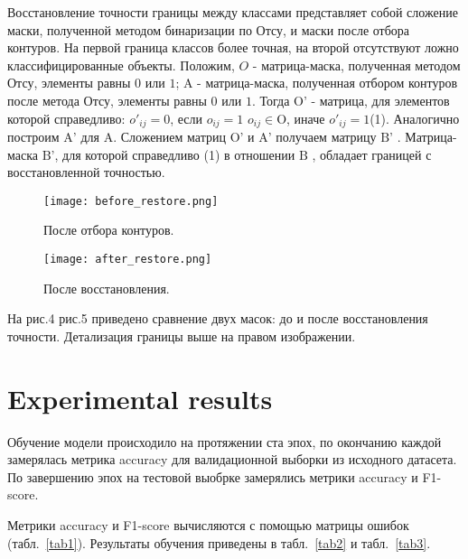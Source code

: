 \documentclass[runningheads]{llncs}
\begin{document}
{Восстановление точности границы между классами представляет  собой сложение маски, полученной методом бинаризации по Отсу, и маски после отбора контуров. На первой граница классов более точная, 
на второй отсутствуют ложно классифицированные объекты.
Положим, $O$ - матрица-маска, полученная методом Отсу, элементы 
равны $0$ или ${\text{1}}$; ${\text{A}}$ - матрица-маска, полученная отбором контуров 
после метода Отсу, элементы равны ${\text{0}}$ или ${\text{1}}$. Тогда ${\text{O'}}$ - матрица,
для элементов которой справедливо: ${o'_{ij} = 0}$, если ${o_{ij} = 1}$ ${o_{ij} \in \text{O}}$, иначе
${o'_{ij} = 1}$(1). Аналогично построим ${\text{A'}}$ для ${\text{A}}$. Сложением матриц ${\text{O'}}$ и ${\text{A'}}$
получаем матрицу ${\text{B'}}$ . Матрица-маска ${\text{B'}}$, для которой справедливо (1)
в отношении ${\text{B}}$ , обладает границей с восстановленной точностью.

\begin{figure}[H]
  \centering
  \begin{minipage}[b]{0.4\textwidth}
    \texttt{[image: before\_restore.png]}
    \caption{После отбора контуров.}
    \label{fig3}
  \end{minipage}
  \hfill
  \begin{minipage}[b]{0.4\textwidth}
    \texttt{[image: after\_restore.png]}
    \caption{После восстановления.}
    \label{fig4}
  \end{minipage}
\end{figure}

На рис.4 рис.5 приведено сравнение двух масок: до и после восстановления 
точности. Детализация границы выше на правом изображении.

\section{Experimental results}

Обучение модели происходило на протяжении ста эпох, по окончанию 
каждой замерялась метрика accuracy для валидационной выборки 
из исходного датасета. По завершению эпох на тестовой выобрке 
замерялись метрики accuracy и F1-score.

Метрики accuracy и F1-score вычисляются с помощью матрицы
ошибок (табл.~\ref{tab1}). Результаты обучения приведены
в табл.~\ref{tab2} и табл.~\ref{tab3}.

}
\end{document}
